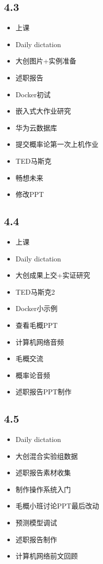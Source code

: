 \documentclass[UTF8]{ctexart}
\begin{document}
\subsection*{4.3}
\begin{itemize}
    \item 上课
    \item Daily dictation
    \item 大创图片+实例准备
    \item 述职报告
    \item Docker初试
    \item 嵌入式大作业研究
    \item 华为云数据库
    \item 提交概率论第一次上机作业
    \item TED马斯克
    \item 畅想未来
    \item 修改PPT
\end{itemize}
\subsection*{4.4}
\begin{itemize}
    \item 上课
    \item Daily dictation
    \item 大创成果上交+实证研究
    \item TED马斯克2
    \item Docker小示例
    \item 查看毛概PPT
    \item 计算机网络音频
    \item 毛概交流
    \item 概率论音频
    \item 述职报告PPT制作
\end{itemize}
\subsection*{4.5}
\begin{itemize}
    \item Daily dictation
    \item 大创混合实验组数据
    \item 述职报告素材收集
    \item 制作操作系统入门
    \item 毛概小班讨论PPT最后改动
    \item 预测模型调试
    \item 述职报告制作
    \item 计算机网络前文回顾
\end{itemize}
\end{document}
